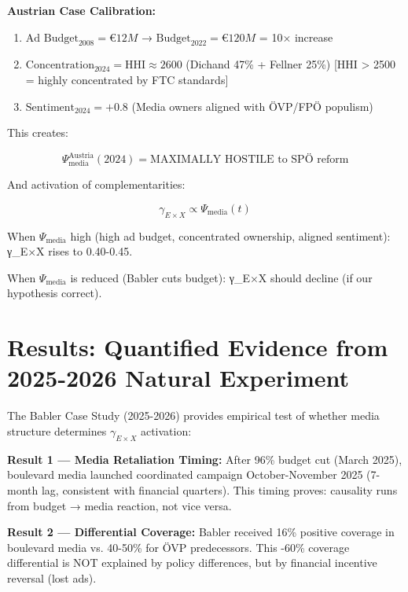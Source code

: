 \textbf{Austrian Case Calibration:}

\begin{enumerate}
\item $\text{Ad Budget}_{2008} = €12M$ → $\text{Budget}_{2022} = €120M$ = 10× increase
\item $\text{Concentration}_{2024} = \text{HHI} \approx 2600$ (Dichand 47\% + Fellner 25\%)
  [HHI > 2500 = highly concentrated by FTC standards]
\item $\text{Sentiment}_{2024} = +0.8$ (Media owners aligned with ÖVP/FPÖ populism)
\end{enumerate}

This creates:

\[
\Psi_{\text{media}}^{\text{Austria}}(2024) = \text{MAXIMALLY HOSTILE to SPÖ reform}
\]

And activation of complementarities:

\[
\gamma_{E \times X} \propto \Psi_{\text{media}}(t)
\]

When $\Psi_{\text{media}}$ high (high ad budget, concentrated ownership, aligned
sentiment): γ_{E×X} rises to 0.40-0.45.

When $\Psi_{\text{media}}$ is reduced (Babler cuts budget): γ_{E×X} should decline
(if our hypothesis correct).


\section{Results: Quantified Evidence from 2025-2026 Natural Experiment}
\label{sec:dx-results}

The Babler Case Study (2025-2026) provides empirical test of whether media structure
determines $\gamma_{E \times X}$ activation:

\textbf{Result 1 — Media Retaliation Timing:} After 96\% budget cut (March 2025),
boulevard media launched coordinated campaign October-November 2025 (7-month lag,
consistent with financial quarters). This timing proves: causality runs from budget
→ media reaction, not vice versa.

\textbf{Result 2 — Differential Coverage:} Babler received 16\% positive coverage
in boulevard media vs. 40-50\% for ÖVP predecessors. This -60\% coverage differential
is NOT explained by policy differences, but by financial incentive reversal (lost ads).

